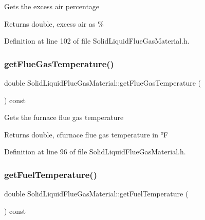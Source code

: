 Gets the excess air percentage \begin{DoxyReturn}{Returns}
double, excess air as \% 
\end{DoxyReturn}


Definition at line 102 of file Solid\+Liquid\+Flue\+Gas\+Material.\+h.

\mbox{\label{class_solid_liquid_flue_gas_material_aba4604158b3c624496d7de4b5fb511e2}} 
\subsubsection{\texorpdfstring{get\+Flue\+Gas\+Temperature()}{getFlueGasTemperature()}}
{\footnotesize\ttfamily double Solid\+Liquid\+Flue\+Gas\+Material\+::get\+Flue\+Gas\+Temperature (\begin{DoxyParamCaption}{ }\end{DoxyParamCaption}) const\hspace{0.3cm}{\ttfamily [inline]}}

Gets the furnace flue gas temperature \begin{DoxyReturn}{Returns}
double, cfurnace flue gas temperature in °F 
\end{DoxyReturn}


Definition at line 96 of file Solid\+Liquid\+Flue\+Gas\+Material.\+h.

\mbox{\label{class_solid_liquid_flue_gas_material_a629ecc7104b6bfbb696d9478c4b48e7a}} 
\subsubsection{\texorpdfstring{get\+Fuel\+Temperature()}{getFuelTemperature()}}
{\footnotesize\ttfamily double Solid\+Liquid\+Flue\+Gas\+Material\+::get\+Fuel\+Temperature (\begin{DoxyParamCaption}{ }\end{DoxyParamCaption}) const\hspace{0.3cm}{\ttfamily [inline]}}

